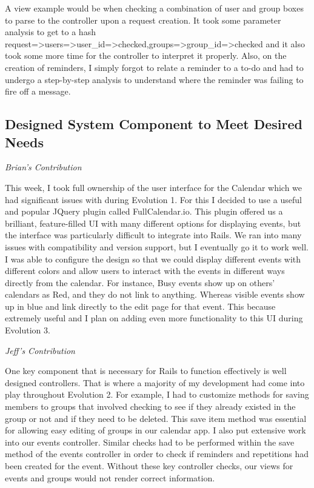 \documentclass[11pt]{article}
\begin{document}
A view example would be when checking a combination of user and group boxes to parse to the controller upon a request creation. It took some parameter analysis to get to a hash request=>{users=>{user\_id=>checked},groups=>{group\_id=>{checked}}} and it also took  some more time for the controller to interpret it properly. Also, on the creation of reminders, I simply forgot to relate a reminder to a to-do and had to undergo a step-by-step analysis to understand where the reminder was failing to fire off a message.

\subsection{Designed System Component to Meet Desired Needs}

\textit{Brian's Contribution}

This week, I took full ownership of the user interface for the Calendar which we had significant issues with during Evolution 1. For this I decided to use a useful and popular JQuery plugin called FullCalendar.io. This plugin offered us a brilliant, feature-filled UI with many different options for displaying events, but the interface was particularly difficult to integrate into Rails. We ran into many issues with compatibility and version support, but I eventually go it to work well. I was able to configure the design so that we could display different events with different colors and allow users to interact with the events in different ways directly from the calendar. For instance, Busy events show up on others' calendars as Red, and they do not link to anything. Whereas visible events show up in blue and link directly to the edit page for that event. This because extremely useful and I plan on adding even more functionality to this UI during Evolution 3. 

\textit{Jeff's Contribution}

One key component that is necessary for Rails to function effectively is well designed controllers.  That is where a majority of my development had come into play throughout Evolution 2.  For example, I had to customize methods for saving members to groups that involved checking to see if they already existed in the group or not and if they need to be deleted.  This save item method was essential for allowing easy editing of groups in our calendar app.  I also put extensive work into our events controller.  Similar checks had to be performed within the save method of the events controller in order to check if reminders and repetitions had been created for the event.  Without these key controller checks, our views for events and groups would not render correct information.
\end{document}
